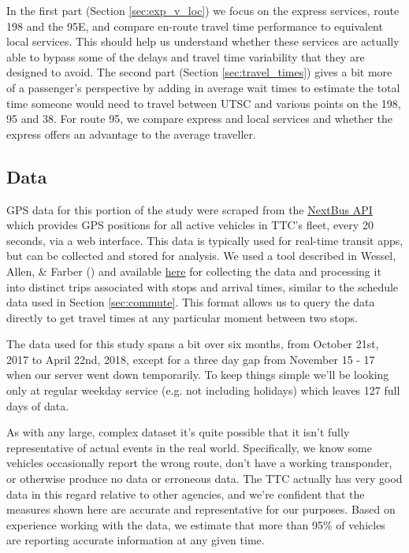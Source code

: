 \documentclass{article}
\begin{document}
	In the first part (Section \ref{sec:exp_v_loc}) we focus on the express services, route 198 and the 95E, and compare en-route travel time performance to equivalent local services. This should help us understand whether these services are actually able to bypass some of the delays and travel time variability that they are designed to avoid.
	The second part (Section \ref{sec:travel_times}) gives a bit more of a passenger's perspective by adding in average wait times to estimate the total time someone would need to travel between UTSC and various points on the 198, 95 and 38. For route 95, we compare express and local services and whether the express offers an advantage to the average traveller. 

	
	\subsection{Data}
		GPS data for this portion of the study were scraped from the \href{https://www.nextbus.com/xmlFeedDocs/NextBusXMLFeed.pdf}{NextBus API} which provides GPS positions for all active vehicles in TTC's fleet, every 20 seconds, via a web interface. This data is typically used for real-time transit apps, but can be collected and stored for analysis. 
		We used a tool described in Wessel, Allen, \& Farber (\cite*{Wessel2017}) and available \href{https://github.com/SAUSy-Lab/retro-gtfs}{here} for collecting the data and processing it into distinct trips associated with stops and arrival times, similar to the schedule data used in Section \ref{sec:commute}. This format allows us to query the data directly to get travel times at any particular moment between two stops.
		
		The data used for this study spans a bit over six months, from October 21st, 2017 to April 22nd, 2018, except for a three day gap from November 15 - 17 when our server went down temporarily. To keep things simple we'll be looking only at regular weekday service (e.g. not including holidays) which leaves 127 full days of data.
		
		As with any large, complex dataset it's quite possible that it isn't fully representative of actual events in the real world. Specifically, we know some vehicles occasionally report the wrong route, don't have a working transponder, or otherwise produce no data or erroneous data. The TTC actually has very good data in this regard relative to other agencies, and we're confident that the measures shown here are accurate and representative for our purposes. Based on experience working with the data, we estimate that more than 95\% of vehicles are reporting accurate information at any given time. 
\end{document}
